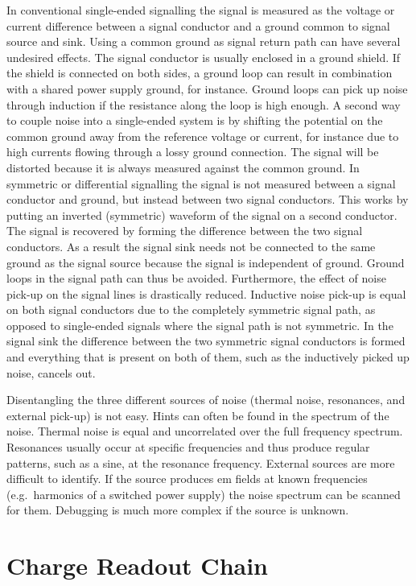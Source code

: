 In conventional single-ended signalling the signal is measured as the voltage or current difference between a signal conductor and a ground common to signal source and sink.
Using a common ground as signal return path can have several undesired effects.
The signal conductor is usually enclosed in a ground shield.
If the shield is connected on both sides, a ground loop can result in combination with a shared power supply ground, for instance.
Ground loops can pick up noise through induction if the resistance along the loop is high enough.
A second way to couple noise into a single-ended system is by shifting the potential on the common ground away from the reference voltage or current, for instance due to high currents flowing through a lossy ground connection.
The signal will be distorted because it is always measured against the common ground.
In symmetric or differential signalling the signal is not measured between a signal conductor and ground, but instead between two signal conductors.
This works by putting an inverted (symmetric) waveform of the signal on a second conductor.
The signal is recovered by forming the difference between the two signal conductors.
As a result the signal sink needs not be connected to the same ground as the signal source because the signal is independent of ground.
Ground loops in the signal path can thus be avoided.
Furthermore, the effect of noise pick-up on the signal lines is drastically reduced.
Inductive noise pick-up is equal on both signal conductors due to the completely symmetric signal path, as opposed to single-ended signals where the signal path is not symmetric.
In the signal sink the difference between the two symmetric signal conductors is formed and everything that is present on both of them, such as the inductively picked up noise, cancels out.

Disentangling the three different sources of noise (thermal noise, resonances, and external pick-up) is not easy.
Hints can often be found in the spectrum of the noise.
Thermal noise is equal and uncorrelated over the full frequency spectrum.
Resonances usually occur at specific frequencies and thus produce regular patterns, such as a sine, at the resonance frequency.
External sources are more difficult to identify.
If the source produces \gls{em} fields at known frequencies (e.g.\ harmonics of a switched power supply) the noise spectrum can be scanned for them.
Debugging is much more complex if the source is unknown.


\section{\AT{} Charge Readout Chain}
\label{sec:studies_at-ro}

